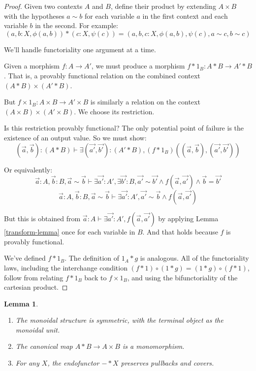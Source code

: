 \documentclass{article}
\newtheorem{lemma}[theorem]{Lemma}
\begin{document}
\begin{proof}
    Given two contexts \(A\) and \(B\), define their product by extending \(A \times B\) with the hypotheses \(a \sim b\) for each variable \(a\) in the first context and each variable \(b\) in the second.
    For example:
    \[(a,b : X, \phi(a,b)) * (c : X, \psi(c)) = (a,b,c : X, \phi(a,b), \psi(c), a \sim c, b \sim c)\]
    
    We'll handle functoriality one argument at a time.

    Given a morphism \(f : A \to A'\), we must produce a morphism \(f*1_B : A*B \to A'*B\).
    That is, a provably functional relation on the combined context \((A*B) \times (A'*B)\).

    But \(f \times 1_B : A \times B \to A' \times B\) is similarly a relation on the context \((A \times B) \times (A' \times B)\).
    We choose its restriction.

    Is this restriction provably functional? The only potential point of failure is the existence of an output value. So we must show:
    \[(\vec{a},\vec{b}) : (A*B) \vdash \exists (\vec{a'},\vec{b'}) : (A'*B), (f*1_B)((\vec{a},\vec{b}), (\vec{a'},\vec{b'}))\]

    Or equivalently:
    \[\vec{a} : A, \vec{b} : B, \vec{a} \sim \vec{b} \vdash \exists \vec{a'} : A', \exists \vec{b'} : B, \vec{a'} \sim \vec{b'} \land f(\vec{a},\vec{a'}) \land \vec{b} = \vec{b'}\]
    \[\vec{a} : A, \vec{b} : B, \vec{a} \sim \vec{b} \vdash \exists \vec{a'} : A', \vec{a'} \sim \vec{b} \land f(\vec{a},\vec{a'})\]

    But this is obtained from \(\vec{a} : A \vdash \exists \vec{a'} : A', f(\vec{a},\vec{a'})\) by applying Lemma \ref{transform-lemma} once for each variable in \(B\).
    And that holds because \(f\) is provably functional.

    \vspace{1em}

    We've defined \(f * 1_B\). The definition of \(1_A * g\) is analogous.
    All of the functoriality laws, including the interchange condition \((f * 1) \circ (1 * g) = (1 * g) \circ (f * 1)\),
    follow from relating \(f * 1_B\) back to \(f \times 1_B\), and using the bifunctoriality of the cartesian product.
\end{proof}

\begin{lemma}\leavevmode
    \begin{enumerate}
        \item The monoidal structure is symmetric, with the terminal object as the monoidal unit.
        \item The canonical map \(A*B \to A \times B\) is a monomorphism.
        \item For any \(X\), the endofunctor \(-*X\) preserves pullbacks and covers.
    \end{enumerate}
\end{lemma}
\end{document}
